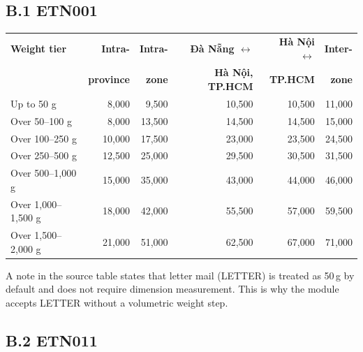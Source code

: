 \subsection*{B.1 ETN001}

\begin{table}[H]
\centering
\small
\setlength{\tabcolsep}{4pt}
\begin{tabular}{lrrrrr}
\hline
\textbf{Weight tier} & \textbf{Intra-} & \textbf{Intra-} & \textbf{Đà Nẵng $\leftrightarrow$} & \textbf{Hà Nội $\leftrightarrow$} & \textbf{Inter-} \\
 & \textbf{province} & \textbf{zone} & \textbf{Hà Nội, TP.HCM} & \textbf{TP.HCM} & \textbf{zone} \\
\hline
Up to 50 g & 8,000 & 9,500 & 10,500 & 10,500 & 11,000 \\
Over 50--100 g & 8,000 & 13,500 & 14,500 & 14,500 & 15,000 \\
Over 100--250 g & 10,000 & 17,500 & 23,000 & 23,500 & 24,500 \\
Over 250--500 g & 12,500 & 25,000 & 29,500 & 30,500 & 31,500 \\
Over 500--1,000 g & 15,000 & 35,000 & 43,000 & 44,000 & 46,000 \\
Over 1,000--1,500 g & 18,000 & 42,000 & 55,500 & 57,000 & 59,500 \\
Over 1,500--2,000 g & 21,000 & 51,000 & 62,500 & 67,000 & 71,000 \\
\hline
\end{tabular}
\end{table}

\noindent A note in the source table states that letter mail (LETTER) is treated as 50\,g by default and does not require dimension measurement. This is why the module accepts LETTER without a volumetric weight step.

\subsection*{B.2 ETN011}

